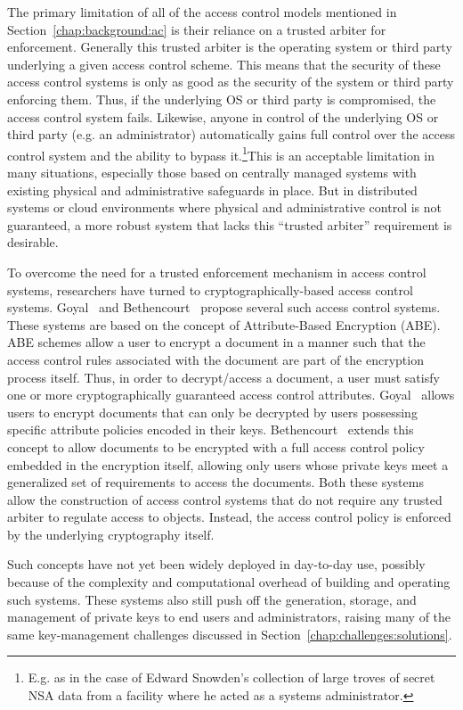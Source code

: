 The primary limitation of all of the access control models mentioned
in Section~\ref{chap:background:ac} is their reliance on a trusted
arbiter for enforcement. Generally this trusted arbiter is the
operating system or third party underlying a given access control
scheme. This means that the security of these access control systems
is only as good as the security of the system or third party enforcing
them. Thus, if the underlying OS or third party is compromised, the
access control system fails. Likewise, anyone in control of the
underlying OS or third party (e.g. an administrator) automatically
gains full control over the access control system and the ability to
bypass it.\footnote{E.g. as in the case of Edward Snowden's collection
  of large troves of secret NSA data from a facility where he acted as
  a systems administrator.}This is an acceptable limitation in many
situations, especially those based on centrally managed systems with
existing physical and administrative safeguards in place. But in
distributed systems or cloud environments where physical and
administrative control is not guaranteed, a more robust system that
lacks this ``trusted arbiter'' requirement is desirable.

To overcome the need for a trusted enforcement mechanism in access
control systems, researchers have turned to cryptographically-based
access control systems. Goyal~\cite{goyal2006} and
Bethencourt~\cite{bethencourt2007} propose several such access control
systems. These systems are based on the concept of Attribute-Based
Encryption (ABE). ABE schemes allow a user to encrypt a document in a
manner such that the access control rules associated with the document
are part of the encryption process itself. Thus, in order to
decrypt/access a document, a user must satisfy one or more
cryptographically guaranteed access control
attributes. Goyal~\cite{goyal2006} allows users to encrypt documents
that can only be decrypted by users possessing specific attribute
policies encoded in their keys. Bethencourt~\cite{bethencourt2007}
extends this concept to allow documents to be encrypted with a full
access control policy embedded in the encryption itself, allowing only
users whose private keys meet a generalized set of requirements to
access the documents. Both these systems allow the construction of
access control systems that do not require any trusted arbiter to
regulate access to objects. Instead, the access control policy is
enforced by the underlying cryptography itself.

Such concepts have not yet been widely deployed in day-to-day use,
possibly because of the complexity and computational overhead of
building and operating such systems. These systems also still push off
the generation, storage, and management of private keys to end users
and administrators, raising many of the same key-management challenges
discussed in Section~\ref{chap:challenges:solutions}.

